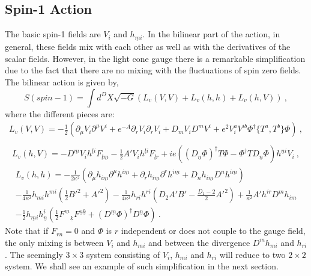\documentclass[a4paper,12pt]{article}
\begin{document}
\subsection{Spin-1 Action}
The basic spin-1 fields are $V_i$ and $h_{\underline m i}$. In the
bilinear part of the action, in general, these fields mix with each
other as well as with the derivatives of the scalar fields. However,
in the light cone gauge there is a remarkable simplification due to
the fact that there are no mixing with the fluctuations of spin zero
fields. The bilinear action is given by,
\begin{equation}
S(spin-1)= \int d^D X \sqrt{-G}\left(L_v(V,V)+ L_v(h,h)
+ L_v(h,V)\right)~,
\label{spin1}
\end{equation}
where the different pieces are:
\begin{eqnarray}
\nonumber L_v(V,V) =  - \frac{1}{2} \left(\partial_\mu
V_i\partial^{\mu} V^i + e^{-A} \partial_r V_i \partial_r V_i + D_m
V_i D^m V^i + e^2 V_i ^a
V^{ib}\Phi^{\dagger} \{T^a,T^b\}\Phi\right)~,\\
\end{eqnarray}
\begin{eqnarray}
L_v(h,V) = - D^{\underline m}V_i h^{\underline l i}F_{\underline
l\underline m} -\frac{1}{2}A'  V_i h^{\underline l i}
F_{\underline l r} +ie ((D_{\underline n}\Phi)^{\dagger}T\Phi -
\Phi^{\dagger}TD_{\underline n}\Phi) h^{\underline n i}V_i~,
\end{eqnarray}
\begin{eqnarray}
\nonumber
L_v(h,h) = -\frac{1}{2\kappa^2}\left(\partial_\mu h_{i\underline
m}\partial^\mu h^{i\underline m} + \partial_r h_{i\underline
m}\partial^r h^{i\underline m} + D_n h_{i\underline m} D^n
h^{i\underline m}\right)\\
\nonumber
 - \frac{1}{4\kappa^2} h_{mi} h^{mi}\left(\frac{1}{2}{B'}^2 + {A'}^2
 \right)
 - \frac{1}{4\kappa^2} h_{ri} h^{ri}\left(D_2 A'B'
 -\frac{D_1-2}{2}{A'}^2 \right)
+  \frac{1}{\kappa^2} {A'} h^{ir} D^m h_{i m}\\
 - \frac{1}{2} h_{\underline m i} h_{\underline n} ^i
\left(\frac{1}{2} F^{\underline m}_{\quad \underline k}
F^{\underline n \underline k}
+ (D^{\underline m}\Phi)^{\dagger}D^{\underline n}\Phi\right)~.
 \label{vhh}
\end{eqnarray}
Note that if $F_{r n} = 0$ and $\Phi$ is $r$ independent or does not
couple to the gauge field, the only mixing is between $V_i$ and
$h_{mi}$ and between the divergence $D^m h_{mi}$ and $h_{ri}$. The
seemingly $3\times 3$ system consisting of $V_i$, $h_{mi}$ and
$h_{ri}$ will reduce to two $2\times 2$ system. We shall see an
example of such simplification in the next section.
\end{document}
